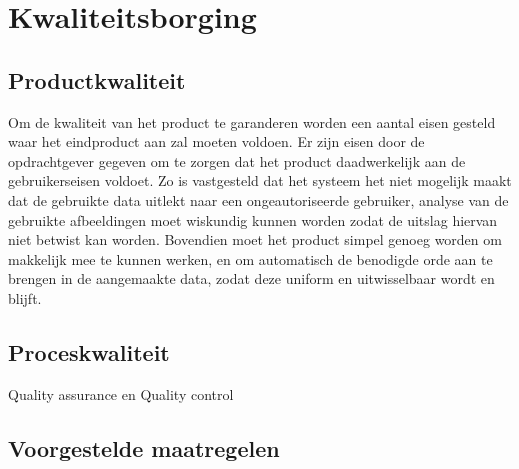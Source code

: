 \section{Kwaliteitsborging}
\label{kwaliteit}

\subsection{Productkwaliteit}
Om de kwaliteit van het product te garanderen worden een aantal eisen gesteld waar het eindproduct aan zal moeten voldoen.
Er zijn eisen door de opdrachtgever gegeven om te zorgen dat het product daadwerkelijk aan de gebruikerseisen voldoet.
Zo is vastgesteld dat het systeem het niet mogelijk maakt dat de gebruikte data uitlekt naar een ongeautoriseerde gebruiker,
analyse van de gebruikte afbeeldingen moet wiskundig kunnen worden zodat de uitslag hiervan niet betwist kan worden.
Bovendien moet het product simpel genoeg worden om makkelijk mee te kunnen werken,
en om automatisch de benodigde orde aan te brengen in de aangemaakte data, zodat deze uniform en uitwisselbaar wordt en blijft.

\subsection{Proceskwaliteit}
Quality assurance en Quality control

\subsection{Voorgestelde maatregelen}



